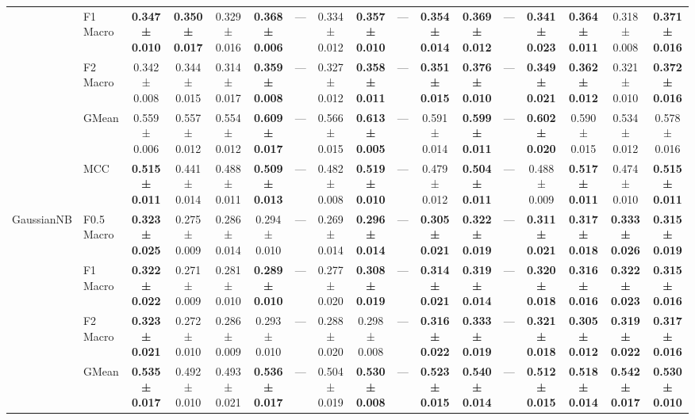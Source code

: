\begin{table}[H]
{\begin{tabular}{llccccccccccccccc}
 & F1 Macro & \textbf{0.347 ± 0.010} & \textbf{0.350 ± 0.017} & 0.329 ± 0.016 & \textbf{0.368 ± 0.006} & — & 0.334 ± 0.012 & \textbf{0.357 ± 0.010} & — & \textbf{0.354 ± 0.014} & \textbf{0.369 ± 0.012} & — & \textbf{0.341 ± 0.023} & \textbf{0.364 ± 0.011} & 0.318 ± 0.008 & \textbf{0.371 ± 0.016} \\
 & F2 Macro & 0.342 ± 0.008 & 0.344 ± 0.015 & 0.314 ± 0.017 & \textbf{0.359 ± 0.008} & — & 0.327 ± 0.012 & \textbf{0.358 ± 0.011} & — & \textbf{0.351 ± 0.015} & \textbf{0.376 ± 0.010} & — & \textbf{0.349 ± 0.021} & \textbf{0.362 ± 0.012} & 0.321 ± 0.010 & \textbf{0.372 ± 0.016} \\
 & GMean & 0.559 ± 0.006 & 0.557 ± 0.012 & 0.554 ± 0.012 & \textbf{0.609 ± 0.017} & — & 0.566 ± 0.015 & \textbf{0.613 ± 0.005} & — & 0.591 ± 0.014 & \textbf{0.599 ± 0.011} & — & \textbf{0.602 ± 0.020} & 0.590 ± 0.015 & 0.534 ± 0.012 & 0.578 ± 0.016 \\
 & MCC & \textbf{0.515 ± 0.011} & 0.441 ± 0.014 & 0.488 ± 0.011 & \textbf{0.509 ± 0.013} & — & 0.482 ± 0.008 & \textbf{0.519 ± 0.010} & — & 0.479 ± 0.012 & \textbf{0.504 ± 0.011} & — & 0.488 ± 0.009 & \textbf{0.517 ± 0.011} & 0.474 ± 0.010 & \textbf{0.515 ± 0.011} \\
\cline{1-17}
\multirow[t]{5}{*}{GaussianNB} & F0.5 Macro & \textbf{0.323 ± 0.025} & 0.275 ± 0.009 & 0.286 ± 0.014 & 0.294 ± 0.010 & — & 0.269 ± 0.014 & \textbf{0.296 ± 0.014} & — & \textbf{0.305 ± 0.021} & \textbf{0.322 ± 0.019} & — & \textbf{0.311 ± 0.021} & \textbf{0.317 ± 0.018} & \textbf{0.333 ± 0.026} & \textbf{0.315 ± 0.019} \\
 & F1 Macro & \textbf{0.322 ± 0.022} & 0.271 ± 0.009 & 0.281 ± 0.010 & \textbf{0.289 ± 0.010} & — & 0.277 ± 0.020 & \textbf{0.308 ± 0.019} & — & \textbf{0.314 ± 0.021} & \textbf{0.319 ± 0.014} & — & \textbf{0.320 ± 0.018} & \textbf{0.316 ± 0.016} & \textbf{0.322 ± 0.023} & \textbf{0.315 ± 0.016} \\
 & F2 Macro & \textbf{0.323 ± 0.021} & 0.272 ± 0.010 & 0.286 ± 0.009 & 0.293 ± 0.010 & — & 0.288 ± 0.020 & 0.298 ± 0.008 & — & \textbf{0.316 ± 0.022} & \textbf{0.333 ± 0.019} & — & \textbf{0.321 ± 0.018} & \textbf{0.305 ± 0.012} & \textbf{0.319 ± 0.022} & \textbf{0.317 ± 0.016} \\
 & GMean & \textbf{0.535 ± 0.017} & 0.492 ± 0.010 & 0.493 ± 0.021 & \textbf{0.536 ± 0.017} & — & 0.504 ± 0.019 & \textbf{0.530 ± 0.008} & — & \textbf{0.523 ± 0.015} & \textbf{0.540 ± 0.014} & — & \textbf{0.512 ± 0.015} & \textbf{0.518 ± 0.014} & \textbf{0.542 ± 0.017} & \textbf{0.530 ± 0.010} \\

\end{tabular}}
\end{table}
